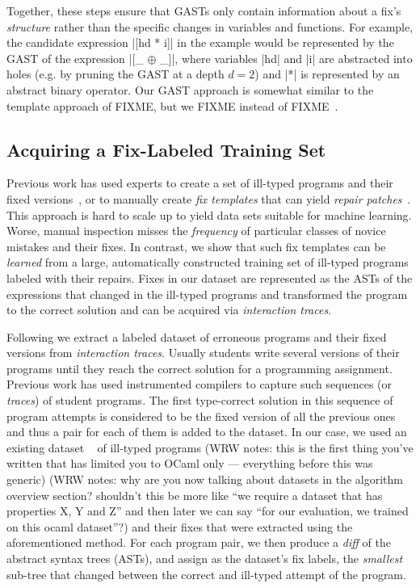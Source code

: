 Together, these steps ensure that GASTs only contain information about a fix's
\emph{structure} rather than the specific changes in variables and functions.
%
For example, the candidate expression |[hd * i]| in the \mbd example would be
represented by the GAST of the expression |[_ $\oplus$ _]|, where variables |hd|
and |i| are abstracted into holes (e.g. by pruning the GAST at a depth $d=2$)
and |*| is represented by an abstract binary operator. Our GAST approach
is somewhat similar to the template approach of FIXME, but we FIXME instead
of FIXME~\cite{FIXME}. 


\subsection{Acquiring a Fix-Labeled Training Set}
\label{sec:overview:data}

Previous work has used experts to create a set of ill-typed programs and their
fixed versions~\citep[][]{Lerner2007-dt, Loncaric2016-uk}, or to manually create
\emph{fix templates} that can yield \emph{repair
patches}~\citep[][]{martinez2013automatically,martinez2015mining}.
%
This approach is hard to scale up to yield data sets suitable for machine
learning. Worse, manual inspection misses the \emph{frequency} of particular
classes of novice mistakes and their fixes.
%
In contrast, we show that such fix templates can be \emph{learned} from a large,
automatically constructed training set of ill-typed programs labeled with their
repairs.
%
Fixes in our dataset are represented as the ASTs of the expressions that changed
in the ill-typed programs and transformed the program to the correct solution
and can be acquired via \emph{interaction traces}.

Following \citep{Seidel:2017} we extract a labeled dataset of erroneous programs
and their fixed versions from \emph{interaction traces}. Usually students write
several versions of their programs until they reach the correct solution for a
programming assignment. Previous work has used instrumented compilers to capture
such sequences (or \emph{traces}) of student programs. The first type-correct
solution in this sequence of program attempts is considered to be the fixed
version of all the previous ones and thus a pair for each of them is added to
the dataset. In our case, we used an existing dataset
~\citep[][]{yunounderstand, Seidel:2017} of ill-typed \ocaml programs 
(WRW notes: this is the first thing you've written that has limited you to 
OCaml only --- everything before this was generic) 
(WRW notes: why are you now talking about datasets in the algorithm
overview section? shouldn't this be more like ``we require a dataset that
has properties X, Y and Z'' and then later we can say ``for our evaluation,
we trained on this ocaml dataset''?) 
and their
fixes that were extracted using the aforementioned method. For each program
pair, we then produce a \emph{diff} of the abstract syntax trees (ASTs), and
assign as the dataset's fix labels, the \emph{smallest} sub-tree that changed
between the correct and ill-typed attempt of the program.


